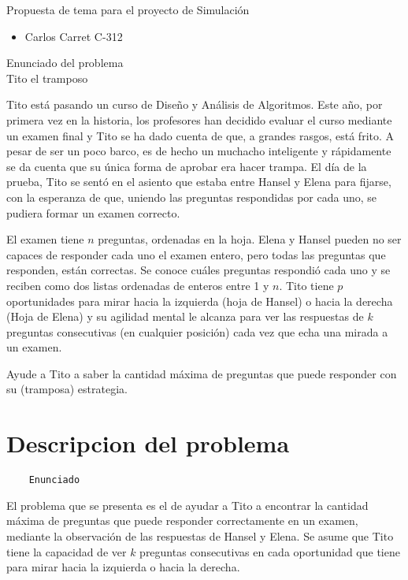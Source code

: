 \documentclass[a4paper, 12pt]{article}
\begin{document}
\begin{center}
\Huge Propuesta de tema para el proyecto de Simulaci\'on
\end{center}

\begin{itemize}
\item Carlos Carret C-312
\end{itemize}

Enunciado del problema\\

Tito el tramposo

Tito está pasando un curso de Diseño y Análisis de Algoritmos. Este año,
por primera vez en la historia, los profesores han decidido evaluar el
curso mediante un examen final y Tito se ha dado cuenta de que, a
grandes rasgos, está frito. A pesar de ser un poco barco, es de hecho un
muchacho inteligente y rápidamente se da cuenta que su única forma de
aprobar era hacer trampa. El día de la prueba, Tito se sentó en el
asiento que estaba entre Hansel y Elena para fijarse, con la esperanza
de que, uniendo las preguntas respondidas por cada uno, se pudiera
formar un examen correcto.

El examen tiene $n$ preguntas, ordenadas en la hoja. Elena y Hansel
pueden no ser capaces de responder cada uno el examen entero, pero todas
las preguntas que responden, están correctas. Se conoce cuáles preguntas
respondió cada uno y se reciben como dos listas ordenadas de enteros
entre 1 y $n$. Tito tiene $p$ oportunidades para mirar hacia la
izquierda (hoja de Hansel) o hacia la derecha (Hoja de Elena) y su
agilidad mental le alcanza para ver las respuestas de $k$ preguntas
consecutivas (en cualquier posición) cada vez que echa una mirada a un
examen.

Ayude a Tito a saber la cantidad máxima de preguntas que puede responder
con su (tramposa) estrategia.

\section{Descripcion del problema}
\begin{verbatim}
    Enunciado
\end{verbatim}

El problema que se presenta es el de ayudar a Tito a encontrar la cantidad máxima de preguntas que puede responder correctamente en un examen, mediante la observación de las respuestas de Hansel y Elena. Se asume que Tito tiene la capacidad de ver $k$ preguntas consecutivas en cada oportunidad que tiene para mirar hacia la izquierda o hacia la derecha.
\end{document}
